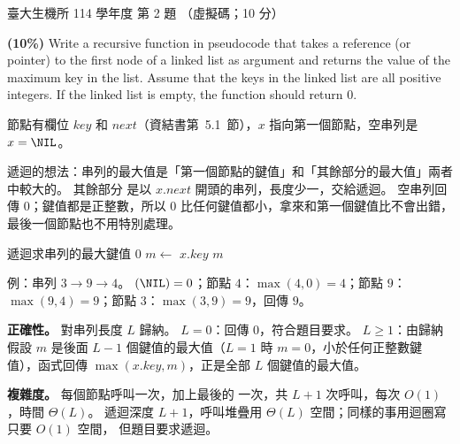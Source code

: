 \begin{pastexam}[label={px:ntu-114-bime-ds-02}]{臺大生機所 114 學年度 第 2 題}
（虛擬碼；10 分）

\textbf{(10\%)} Write a recursive function in pseudocode that takes a reference (or pointer) to the
first node of a linked list as argument and returns the value of the maximum key in the list.
Assume that the keys in the linked list are all positive integers. If the linked list is empty, the
function should return 0.
\end{pastexam}

\begin{pastsoln}
節點有欄位 $\mathit{key}$ 和 $\mathit{next}$（資結書第~5.1~節），$x$ 指向第一個節點，空串列是
$x = \NIL$。

遞迴的想法：串列的最大值是「第一個節點的鍵值」和「其餘部分的最大值」兩者中較大的。 其餘部分
是以 $x.\mathit{next}$ 開頭的串列，長度少一，交給遞迴。 空串列回傳 $0$；鍵值都是正整數，所以
$0$ 比任何鍵值都小，拿來和第一個鍵值比不會出錯，最後一個節點也不用特別處理。

\begin{pseudo}{遞迴求串列的最大鍵值}
        \State \Return $0$ 
    \EndIf
    \State $m \gets$  
        \State \Return $x.\mathit{key}$
    \Else
        \State \Return $m$
    \EndIf
\EndFunction
\end{pseudo}

例：串列 $3 \to 9 \to 4$。 $(\NIL) = 0$；節點 $4$：$\max(4, 0) = 4$；節點 $9$：
$\max(9, 4) = 9$；節點 $3$：$\max(3, 9) = 9$，回傳 $9$。

\textbf{正確性。} 對串列長度 $L$ 歸納。 $L = 0$：回傳 $0$，符合題目要求。 $L \ge 1$：由歸納假設
$m$ 是後面 $L - 1$ 個鍵值的最大值（$L = 1$ 時 $m = 0$，小於任何正整數鍵值），函式回傳
$\max(x.\mathit{key}, m)$，正是全部 $L$ 個鍵值的最大值。

\textbf{複雜度。} 每個節點呼叫一次，加上最後的 \NIL 一次，共 $L + 1$ 次呼叫，每次 $O(1)$，時間
$\Theta(L)$。 遞迴深度 $L + 1$，呼叫堆疊用 $\Theta(L)$ 空間；同樣的事用迴圈寫只要 $O(1)$ 空間，
但題目要求遞迴。
\end{pastsoln}
